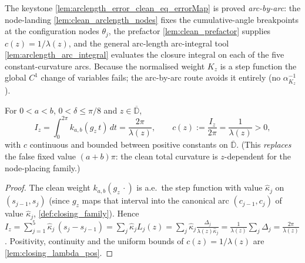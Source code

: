 The keystone \cref{lem:arclength_error_clean_eq_errorMap} is proved
\emph{arc-by-arc}: the node-landing \cref{lem:clean_arclength_nodes} fixes the
cumulative-angle breakpoints at the configuration nodes $\theta_j$, the prefactor
\cref{lem:clean_prefactor} supplies $c(z)=1/\lambda(z)$, and the general arc-length
arc-integral tool \cref{lem:arclength_arc_integral} evaluates the closure integral
on each of the five constant-curvature arcs. Because the normalised weight $K_z$ is
a step function the global $C^1$ change of variables fails; the arc-by-arc route
avoids it entirely (no $\alpha_{K_z}^{-1}$).

\begin{lemma}
[Clean total curvature and the positive prefactor $c(z)=1/\lambda(z)$]
  \label{lem:clean_prefactor}
  For $0<a<b$, $0<\delta\le\pi/8$ and $z\in\overline{\mathbb{D}}$,
  \[
    I_z=\int_0^{2\pi}k_{a,b}(g_z\,t)\,dt=\frac{2\pi}{\lambda(z)},
    \qquad c(z):=\frac{I_z}{2\pi}=\frac1{\lambda(z)}>0 ,
  \]
  with $c$ continuous and bounded between positive constants on
  $\overline{\mathbb{D}}$. (This \emph{replaces} the false fixed value $(a+b)\pi$:
  the clean total curvature is $z$-dependent for the node-placing family.)
\end{lemma}
\begin{proof}
  The clean weight $k_{a,b}(g_z\,\cdot)$ is a.e.\ the step
  function with value $\hat\kappa_j$ on $(s_{j-1},s_j)$ (since $g_z$ maps that
  interval into the canonical arc $(c_{j-1},c_j)$ of value $\hat\kappa_j$,
  \cref{def:closing_family}). Hence
  $I_z=\sum_{j=1}^5\hat\kappa_j\,(s_j-s_{j-1})=\sum_j\hat\kappa_j L_j(z)
   =\sum_j\hat\kappa_j\frac{\Delta_j}{\lambda(z)\hat\kappa_j}
   =\frac1{\lambda(z)}\sum_j\Delta_j=\frac{2\pi}{\lambda(z)}$. Positivity,
  continuity and the uniform bounds of $c(z)=1/\lambda(z)$ are
  \cref{lem:closing_lambda_pos}.
\end{proof}

